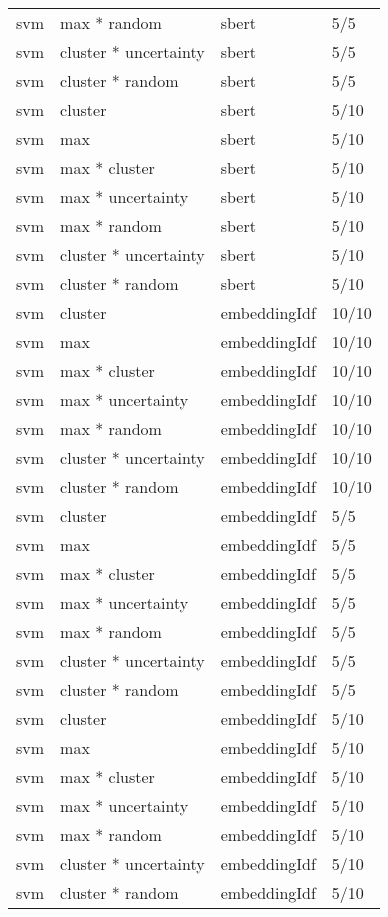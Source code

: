 \documentclass[12pt,twoside]{reedthesis}
\begin{document}
\begin{longtable}{llll}
svm & max * random & sbert & 5/5\\
svm & cluster * uncertainty & sbert & 5/5\\
\addlinespace
svm & cluster * random & sbert & 5/5\\
svm & cluster & sbert & 5/10\\
svm & max & sbert & 5/10\\
svm & max * cluster & sbert & 5/10\\
svm & max * uncertainty & sbert & 5/10\\
\addlinespace
svm & max * random & sbert & 5/10\\
svm & cluster * uncertainty & sbert & 5/10\\
svm & cluster * random & sbert & 5/10\\
svm & cluster & embeddingIdf & 10/10\\
svm & max & embeddingIdf & 10/10\\
\addlinespace
svm & max * cluster & embeddingIdf & 10/10\\
svm & max * uncertainty & embeddingIdf & 10/10\\
svm & max * random & embeddingIdf & 10/10\\
svm & cluster * uncertainty & embeddingIdf & 10/10\\
svm & cluster * random & embeddingIdf & 10/10\\
\addlinespace
svm & cluster & embeddingIdf & 5/5\\
svm & max & embeddingIdf & 5/5\\
svm & max * cluster & embeddingIdf & 5/5\\
svm & max * uncertainty & embeddingIdf & 5/5\\
svm & max * random & embeddingIdf & 5/5\\
\addlinespace
svm & cluster * uncertainty & embeddingIdf & 5/5\\
svm & cluster * random & embeddingIdf & 5/5\\
svm & cluster & embeddingIdf & 5/10\\
svm & max & embeddingIdf & 5/10\\
svm & max * cluster & embeddingIdf & 5/10\\
\addlinespace
svm & max * uncertainty & embeddingIdf & 5/10\\
svm & max * random & embeddingIdf & 5/10\\
svm & cluster * uncertainty & embeddingIdf & 5/10\\
svm & cluster * random & embeddingIdf & 5/10\\

\end{longtable}
\end{document}
